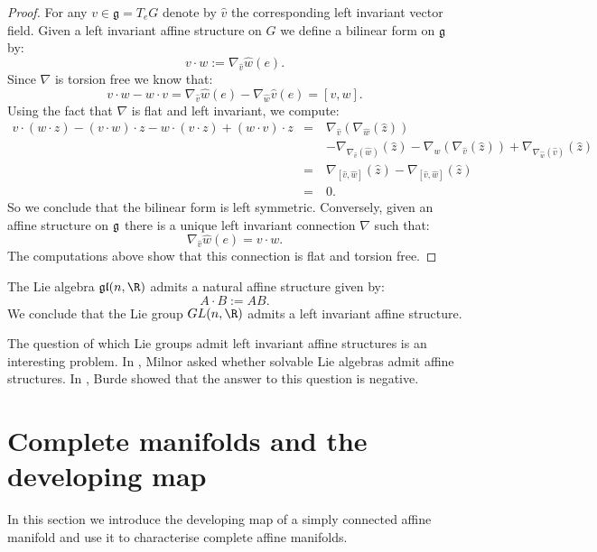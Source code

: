 \begin{proof}
	For any $v \in \mathfrak{g}=T_eG$ denote by $\hat{v}$ the corresponding left invariant vector field. Given a left invariant affine structure on $G$ we define a bilinear form on $\mathfrak{g}$ by:
	\[ v\cdot w:= \nabla_{\hat v}\hat{w}(e).\]
	Since $\nabla$ is torsion free we know that:
	\[ v \cdot w - w \cdot v =  \nabla_{\hat v}\hat{w}(e)-  \nabla_{\hat w}\hat{v}(e) =[v,w].\]
	Using the fact that $\nabla$ is flat and left invariant, we compute:
	\begin{eqnarray*}
		v\cdot (w \cdot z)-(v\cdot w) \cdot z-w\cdot (v \cdot z)+(w\cdot v)\cdot z&=& \nabla_{\hat{v}} (\nabla_{\hat{w}}(\hat{z}))\\
		&\quad&-\nabla_{\nabla_{\hat{v}}(\hat{w})}(\hat{z}) - \nabla_{\hat{w}} (\nabla_{\hat{v}}(\hat{z}))+\nabla_{\nabla_{\hat{w}}(\hat{v})}(\hat{z})\\
		&=&\nabla_{[\hat{v},\hat{w}]}(\hat{z})-\nabla_{[\hat{v},\hat{w}]}(\hat{z})\\
		&=&0.
	\end{eqnarray*}
	So we conclude that the bilinear form is left symmetric. Conversely, given an affine structure on $\frak{g}$ there is a unique left invariant connection $\nabla$ such that:
	\[ \nabla_{\hat{v}}\hat{w}(e)=v\cdot w.\]
	The computations above show that this connection is flat and torsion free.
\end{proof}

\begin{example}
	The Lie algebra $\mathfrak{gl}(n,\R)$ admits a natural affine structure given by:
	\[ A \cdot B:= AB.\]
	We conclude that the Lie group $GL(n, \R)$ admits a left invariant affine structure.
\end{example}


The question of which Lie groups admit left invariant affine structures is an interesting problem. In \cite{Milnor2}, Milnor asked whether solvable Lie algebras admit affine structures. In \cite{Bu}, Burde showed that the answer to this question is negative.

\section{Complete manifolds and the developing map}

In this section we introduce the developing map of a simply connected affine manifold and use it to characterise complete affine manifolds.

